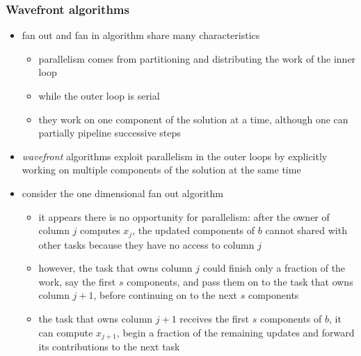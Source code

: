 \begin{frame}[fragile]
%
  \frametitle{Wavefront algorithms}
%
  \begin{itemize}
%
  \item fan out and fan in algorithm share many characteristics
    \begin{itemize}
    \item parallelism comes from partitioning and distributing the work of the inner loop
    \item while the outer loop is serial
    \item they work on one component of the solution at a time, although one can partially
      pipeline successive steps
    \end{itemize}
%
    \item {\em wavefront} algorithms exploit parallelism in the outer loops by explicitly
      working on multiple components of the solution at the same time
%
    \item consider the one dimensional fan out algorithm
      \begin{itemize}
      \item it appears there is no opportunity for parallelism: after the owner of column $j$
        computes $x_{j}$, the updated components of $b$ cannot shared with other tasks because
        they have no access to column $j$
      \item however, the task that owns column $j$ could finish only a fraction of the work,
        say the first $s$ components, and pass them on to the task that owns column $j+1$,
        before continuing on to the next $s$ components
      \item the task that owns column $j+1$ receives the first $s$ components of $b$, it can
        compute $x_{j+1}$, begin a fraction of the remaining updates and forward its
        contributions to the next task
      \end{itemize}
%
  \end{itemize}
%
\end{frame}

